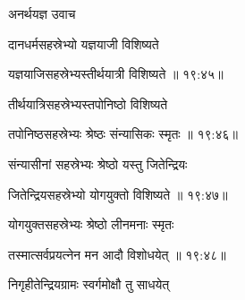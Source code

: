 {\devanagarifont अनर्थयज्ञ उवाच {\dandab}\dontdisplaylinenum  }%

{\devanagarifont दानधर्मसहस्रेभ्यो यज्ञयाजी विशिष्यते \thinspace{\danda} \dontdisplaylinenum }%
 

{\devanagarifont यज्ञयाजिसहस्रेभ्यस्तीर्थयात्री विशिष्यते {॥ १९:४५॥} \veg\dontdisplaylinenum }%

{\devanagarifont तीर्थयात्रिसहस्रेभ्यस्तपोनिष्ठो विशिष्यते \thinspace{\dandab} \dontdisplaylinenum }%


{\devanagarifont तपोनिष्ठसहस्रेभ्यः श्रेष्ठः संन्यासिकः स्मृतः {॥ १९:४६॥} \veg\dontdisplaylinenum }%

{\devanagarifont संन्यासीनां सहस्रेभ्यः श्रेष्ठो यस्तु जितेन्द्रियः \thinspace{\dandab} \dontdisplaylinenum }%


{\devanagarifont जितेन्द्रियसहस्रेभ्यो योगयुक्तो विशिष्यते {॥ १९:४७॥} \veg\dontdisplaylinenum }%
 
{\devanagarifont योगयुक्तसहस्रेभ्यः श्रेष्ठो लीनमनाः स्मृतः \thinspace{\dandab} \dontdisplaylinenum }%


{\devanagarifont तस्मात्सर्वप्रयत्नेन मन आदौ विशोधयेत् {॥ १९:४८॥} \veg\dontdisplaylinenum }%

{\devanagarifont निगृहीतेन्द्रियग्रामः स्वर्गमोक्षौ तु साधयेत् \thinspace{\dandab} \dontdisplaylinenum }%

